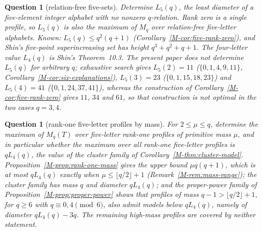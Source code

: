 \documentclass[11pt,reqno]{amsart}
\theoremstyle{plain}
\newtheorem{question}[theorem]{Question}
\theoremstyle{definition}
\theoremstyle{plain}
\theoremstyle{plain}
\theoremstyle{plain}
\theoremstyle{plain}
\theoremstyle{plain}
\theoremstyle{plain}
\theoremstyle{definition}
\theoremstyle{definition}
\theoremstyle{definition}
\theoremstyle{plain}
\begin{document}
\begin{question}[relation-free five-sets]\label{M-q:L5}
Determine $L_5(q)$, the least diameter of a five-element integer alphabet
with no nonzero $q$-relation. Rank zero is a single profile, so $L_5(q)$
is also the maximum of $M_q$ over relation-free five-letter alphabets.
Known: $L_5(q)\le q^2(q+1)$ (Corollary~\ref{M-cor:five-rank-zero}), and
Shin's five-point superincreasing set \cite[Corollary~7.4]{M-Shin26} has
height $q^3+q^2+q+1$. The four-letter value $L_4(q)$ is Shin's
Theorem~10.3. The present paper does not determine $L_5(q)$ for arbitrary $q$; exhaustive search
 gives $L_5(2)=11$ ($\{0,1,4,9,11\}$,
Corollary~\ref{M-cor:six-explanations}), $L_5(3)=23$ ($\{0,1,15,18,23\}$) and
$L_5(4)=41$ ($\{0,1,24,37,41\}$), whereas the construction of
Corollary~\ref{M-cor:five-rank-zero} gives $11$, $34$ and $61$, so that
construction is not optimal in the two cases $q=3,4$.
\end{question}

\begin{question}[rank-one five-letter profiles by mass]\label{M-q:rank-one-mass}
For $2\le\mu\le q$, determine the maximum of $M_q(T)$ over five-letter
rank-one profiles of primitive mass $\mu$, and in particular whether the
maximum over all rank-one five-letter profiles is $qL_4(q)$, the value of
the cluster family of Corollary~\ref{M-thm:cluster-model}.
Proposition~\ref{M-prop:rank-one-mass} gives the upper bound $\mu q(q+1)$,
which is at most $qL_4(q)$ exactly when $\mu\le\lfloor q/2\rfloor+1$
(Remark~\ref{M-rem:mass-range}); the cluster family has mass $q$ and
diameter $qL_4(q)$; and the proper-power family of
Proposition~\ref{M-prop:proper-power} shows that profiles of mass
$q-1>\lfloor q/2\rfloor+1$, for $q\ge6$ with $q\equiv0,4\pmod6$, also
admit models below $qL_4(q)$, namely of diameter $qL_4(q)-3q$. The
remaining high-mass profiles are covered by neither statement.
\end{question}
\end{document}
